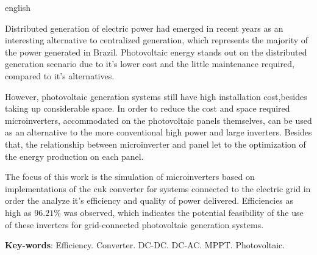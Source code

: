 \documentclass[
	12pt,				%
	openright,			%
	twoside,			%
	a4paper,			%
	english,			%
	french,				%
	spanish,			%
	brazil,				%
	]{abntex2}
\begin{document}
	\begin{resumo}[Abstract]
		\begin{otherlanguage*}{english}

		Distributed generation of electric power had emerged in recent years as an interesting alternative to centralized generation, which represents the majority of the power generated in Brazil. Photovoltaic energy stands out on the distributed generation scenario due to it's lower cost and the little maintenance required, compared to it's alternatives. 

		However, photovoltaic generation systems still have high installation cost,besides taking up considerable space. In order to reduce the cost and space required microinverters, accommodated on the photovoltaic panels themselves, can be used as an alternative to the more conventional high power and large inverters. Besides that, the relationship between microinverter and panel let to the optimization of the energy production on each panel.

		The focus of this work is the simulation  of microinverters based on implementations of the cuk converter for systems connected to the electric grid in order the analyze it's efficiency and quality of power delivered. Efficiencies as high as $96.21\%$ was observed, which indicates the potential feasibility of the use of these inverters for grid-connected photovoltaic generation systems.

		\vspace{\onelineskip}
		\noindent
		\textbf{Key-words}: Efficiency. Converter. DC-DC. DC-AC. MPPT. Photovoltaic. 
	\end{otherlanguage*}
	\end{resumo}

	\listoffigures*
	\clearpage

	\listoftables*
	\clearpage
\end{document}
